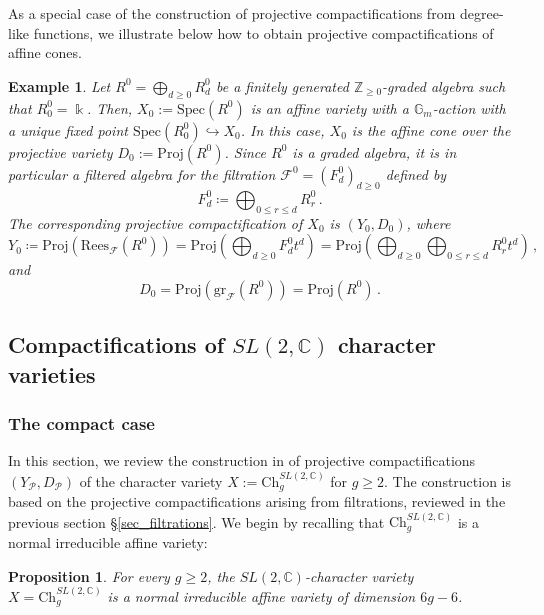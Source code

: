 \documentclass[12pt,letterpaper, reqno]{amsart}
\newtheorem{proposition}[theorem]{Proposition}
\theoremstyle{defstyle} \newtheorem{definition}[theorem]{Definition}
\newtheorem{example}[theorem]{Example}
\theoremstyle{remark}
\numberwithin{equation}{section}
\numberwithin{figure}{section}
\newcommand{\cF} {\mathcal{F}}
\newcommand{\Spec} {\mathrm{Spec}}
\newcommand{\Proj} {\mathrm{Proj}}
\newcommand{\kk} {\Bbbk}
\newcommand{\CC} {\mathbb{C}}
\newcommand{\ZZ} {\mathbb{Z}}
\newcommand{\cP} {\mathcal{P}}
\begin{document}
As a special case of the construction of projective compactifications from degree-like functions, we illustrate below how to obtain projective compactifications of affine cones.

\begin{example}
\label{Example:projcone}
  Let $R^0=\bigoplus_{d \geq 0} R_d^0$ be a finitely generated $\ZZ_{\geq 0}$-graded algebra such that $R_0^0 = \kk$. Then, $X_0:=\Spec(R^0)$ is an affine variety with a $\mathbb{G}_m$-action with a unique fixed point $\Spec(R_0^0) \hookrightarrow X_0$. In this case, $X_0$ is the affine cone over the projective variety $D_0:=\Proj(R^0)$. 
  Since $R^0$ is a graded algebra, it is in particular a filtered algebra for the filtration $\cF^0=(F_d^0)_{d\geq 0}$ defined by 
 \[ F_{d}^0 \coloneqq \bigoplus_{0 \leq r \leq d} R_r^0\,.\] 
 The corresponding projective compactification of $X_0$
is $(Y_0,D_0)$, where  \[  Y_0 \coloneq \Proj(\mathrm{Rees}_{\cF}(R^0))= \Proj \left( \bigoplus_{d \geq 0} F_d^0 t^d \right) = \Proj  \left( \bigoplus_{d \geq 0} \bigoplus_{0 \leq r \leq d} R_r^0 t^d \right) \,, \]
 and 
 \[ D_0 = \Proj(\mathrm{gr}_\cF(R^0)) =\Proj(R^0) \,.\]
\end{example}




\subsection{Compactifications of $SL(2,\CC)$ character varieties}
\label{sec_compactifications_SL2}


\subsubsection{The compact case}
\label{sec_review_compact}

In this section, we review the construction in \cite{ayilliath2025geometric} of projective compactifications $(Y_\cP,D_\cP)$ of the character variety $
X:=\mathrm{Ch}_g^{SL(2,\CC)}$ for $g \geq 2$.
The construction is based on the projective compactifications arising from filtrations, reviewed in the previous section
\S\ref{sec_filtrations}. We begin by recalling that $\mathrm{Ch}_g^{SL(2,\CC)}$ is a normal irreducible affine variety: 



\begin{proposition} \label{prop_normal_closed}
    For every $g \geq 2$, the $SL(2,\CC)$-character variety $X=\mathrm{Ch}_g^{SL(2,\CC)}$ is a normal irreducible affine variety of dimension $6g-6$.
\end{proposition}
\end{document}

